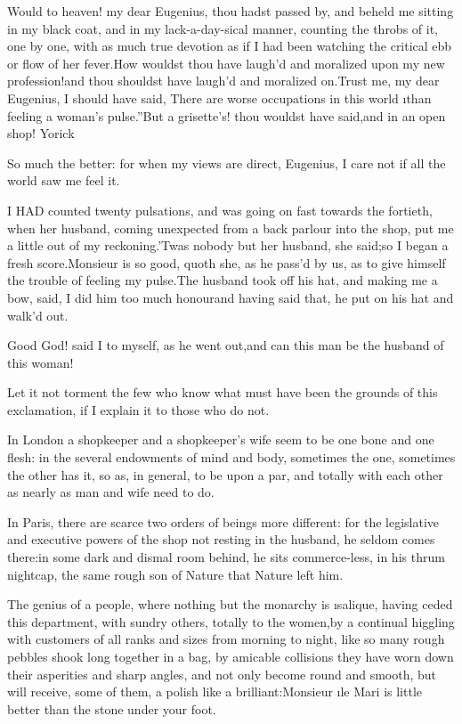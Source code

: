 \documentclass[twoside]{article}
\begin{document}
\tsk Would to heaven! my dear Eugenius, thou hadst passed by, and beheld me
sitting in my black coat, and in my lack-a-day-sical manner, counting the
throbs of it, one by one, with as much true devotion as if I had been
watching the critical ebb or flow of her fever.\tsk How wouldst thou have
laugh’d and moralized upon my new profession!\tsk and thou shouldst have
laugh’d and moralized on.\tsk Trust me, my dear Eugenius, I should have said,
\lqq There are worse occupations in this world \i{than feeling a woman’s
pulse}.”\tsk But a grisette’s! thou wouldst have said,\tsk and in an open shop!
Yorick\tsk 

\tsk So much the better: for when my views are direct, Eugenius, I care not
if all the world saw me feel it.






I HAD counted twenty pulsations, and was going on fast towards the
fortieth, when her husband, coming unexpected from a back parlour into
the shop, put me a little out of my reckoning.\tsk ’Twas nobody but her
husband, she said;\tsk so I began a fresh score.\tsk Monsieur is so good, quoth
she, as he pass’d by us, as to give himself the trouble of feeling my
pulse.\tsk The husband took off his hat, and making me a bow, said, I did him
too much honour\tsk and having said that, he put on his hat and walk’d out.

Good God! said I to myself, as he went out,\tsk and can this man be the
husband of this woman!

Let it not torment the few who know what must have been the grounds of
this exclamation, if I explain it to those who do not.

In London a shopkeeper and a shopkeeper’s wife seem to be one bone and
one flesh: in the several endowments of mind and body, sometimes the one,
sometimes the other has it, so as, in general, to be upon a par, and
totally with each other as nearly as man and wife need to do.

In Paris, there are scarce two orders of beings more different: for the
legislative and executive powers of the shop not resting in the husband,
he seldom comes there:\tsk in some dark and dismal room behind, he sits
commerce-less, in his thrum nightcap, the same rough son of Nature that
Nature left him.

The genius of a people, where nothing but the monarchy is \i{salique},
having ceded this department, with sundry others, totally to the
women,\tsk by a continual higgling with customers of all ranks and sizes from
morning to night, like so many rough pebbles shook long together in a
bag, by amicable collisions they have worn down their asperities and
sharp angles, and not only become round and smooth, but will receive,
some of them, a polish like a brilliant:\tsk Monsieur \i{le Mari} is little
better than the stone under your foot.
\end{document}
